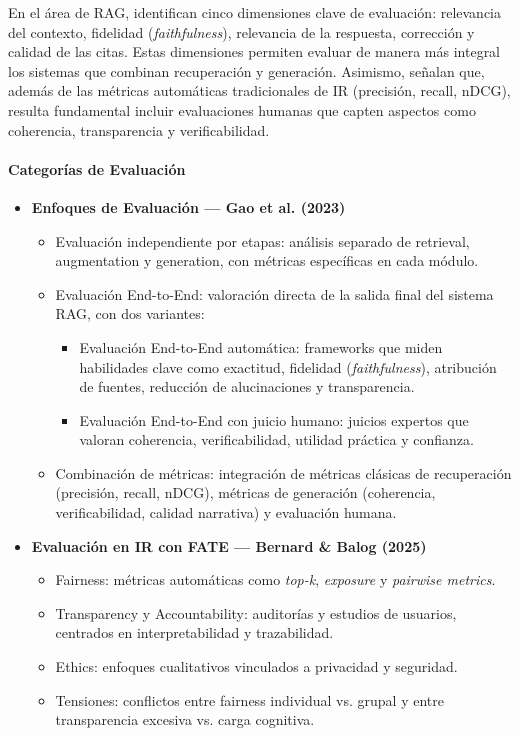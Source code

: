 En el área de RAG, \textcite{knollmeyer2024benchmarking} identifican cinco dimensiones clave de evaluación: relevancia del contexto, fidelidad (\textit{faithfulness}), relevancia 
de la respuesta, corrección y calidad de las citas. Estas dimensiones permiten evaluar de manera más integral los sistemas que combinan recuperación y generación. Asimismo, 
\textcite{gao2023rag} señalan que, además de las métricas automáticas tradicionales de IR (precisión, recall, nDCG), resulta fundamental incluir evaluaciones humanas que capten 
aspectos como coherencia, transparencia y verificabilidad.  

\paragraph{Categorías de Evaluación}
\begin{itemize}
  \item \textbf{Enfoques de Evaluación — Gao et al. (2023)}
        \begin{itemize}
          \item Evaluación independiente por etapas: análisis separado de retrieval, augmentation y generation, con métricas específicas en cada módulo.
          \item Evaluación End-to-End: valoración directa de la salida final del sistema RAG, con dos variantes:
          \begin{itemize}
              \item Evaluación End-to-End automática: frameworks que miden habilidades clave como exactitud, fidelidad (\textit{faithfulness}), atribución de fuentes, reducción de alucinaciones y transparencia.
              \item Evaluación End-to-End con juicio humano: juicios expertos que valoran coherencia, verificabilidad, utilidad práctica y confianza.
          \end{itemize}
          \item Combinación de métricas: integración de métricas clásicas de recuperación (precisión, recall, nDCG), métricas de generación (coherencia, verificabilidad, calidad narrativa) y evaluación humana.
      \end{itemize}
    \item \textbf{Evaluación en IR con FATE — Bernard \& Balog (2025)}
    \begin{itemize}
        \item Fairness: métricas automáticas como \textit{top-k}, \textit{exposure} y \textit{pairwise metrics}.
        \item Transparency y Accountability: auditorías y estudios de usuarios, centrados en interpretabilidad y trazabilidad.
        \item Ethics: enfoques cualitativos vinculados a privacidad y seguridad.
        \item Tensiones: conflictos entre fairness individual vs. grupal y entre transparencia excesiva vs. carga cognitiva.
    \end{itemize}


\end{itemize}
